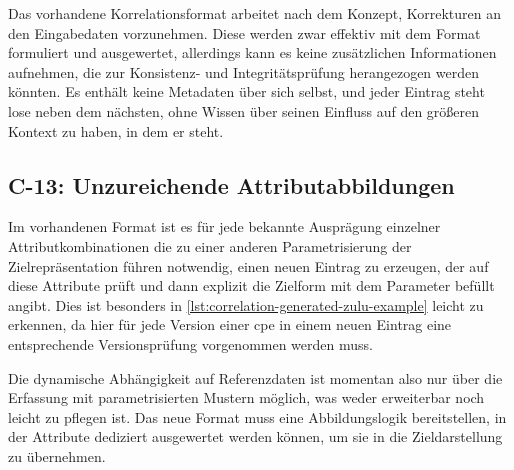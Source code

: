 Das vorhandene Korrelationsformat arbeitet nach dem Konzept, Korrekturen an den Eingabedaten vorzunehmen.
Diese werden zwar effektiv mit dem Format formuliert und ausgewertet, allerdings kann es keine zusätzlichen Informationen aufnehmen, die zur Konsistenz- und Integritätsprüfung herangezogen werden könnten.
Es enthält keine Metadaten über sich selbst, und jeder Eintrag steht lose neben dem nächsten, ohne Wissen über seinen Einfluss auf den größeren Kontext zu haben, in dem er steht.

\subsection{C-13: Unzureichende Attributabbildungen}\label{subsec:c-13-attribut-abbildung-unzureichend}

Im vorhandenen Format ist es für jede bekannte Ausprägung einzelner Attributkombinationen die zu einer anderen Parametrisierung der Zielrepräsentation führen notwendig, einen neuen Eintrag zu erzeugen, der auf diese Attribute prüft und dann explizit die Zielform mit dem Parameter befüllt angibt.
Dies ist besonders in \autoref{lst:correlation-generated-zulu-example} leicht zu erkennen, da hier für jede Version einer \acrshort{cpe} in einem neuen Eintrag eine entsprechende Versionsprüfung vorgenommen werden muss.

Die dynamische Abhängigkeit auf Referenzdaten ist momentan also nur über die Erfassung mit parametrisierten Mustern möglich, was weder erweiterbar noch leicht zu pflegen ist.
Das neue Format muss eine Abbildungslogik bereitstellen, in der Attribute dediziert ausgewertet werden können, um sie in die Zieldarstellung zu übernehmen.
